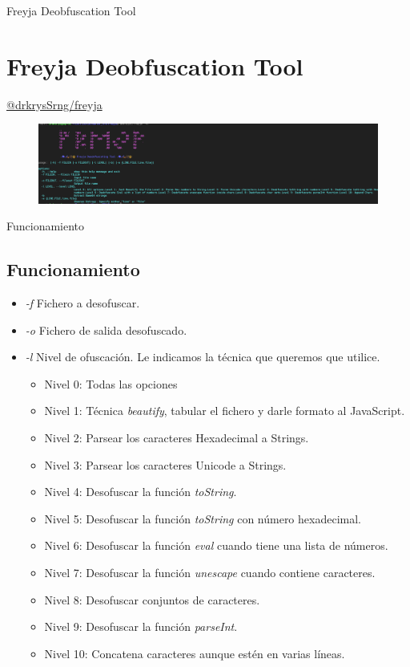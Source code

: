 \documentclass[aspectratio=169]{beamer}
\begin{document}
    
  	\begin{frame}{Freyja Deobfuscation Tool}
  	\section{Freyja Deobfuscation Tool}
  		\href{https://github.com/drkrysSrng/freyja}{@drkrysSrng/freyja}
	\begin{figure}[H]
		\centering
		\includegraphics[width=15cm]{images/usage.png}
	\end{figure}
  	
  	\end{frame}
  	\begin{frame}{Funcionamiento}
  	\subsection{Funcionamiento}
	\begin{itemize}
		\item \textit{-f} Fichero a desofuscar.
		\item \textit{-o} Fichero de salida desofuscado.
		\item \textit{-l} Nivel de ofuscación. Le indicamos la técnica que queremos que utilice.
		\begin{itemize}
			\item Nivel 0: Todas las opciones
			\item Nivel 1: Técnica \textit{beautify}, tabular el fichero y darle formato al JavaScript.			
			\item Nivel 2: Parsear los caracteres Hexadecimal a Strings.
			\item Nivel 3: Parsear los caracteres Unicode a Strings.
			\item Nivel 4: Desofuscar la función \textit{toString}.
			\item Nivel 5: Desofuscar la función  \textit{toString} con número hexadecimal.
			\item Nivel 6: Desofuscar la función  \textit{eval} cuando tiene una lista de números.
			\item Nivel 7: Desofuscar la función  \textit{unescape} cuando contiene caracteres.
			\item Nivel 8: Desofuscar conjuntos de caracteres.
			\item Nivel 9: Desofuscar la función  \textit{parseInt}.
			\item Nivel 10: Concatena caracteres aunque estén en varias líneas.
		\end{itemize}
	\end{itemize}
  	\end{frame}
  	
\end{document}

